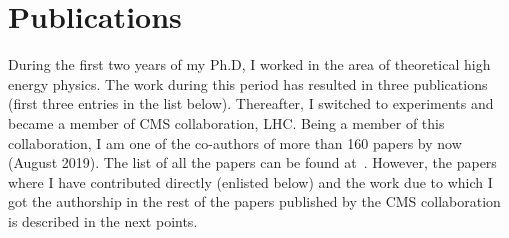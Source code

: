 \chapter {Publications}
During the first two years of my Ph.D, I worked in the area of theoretical high energy physics. The work during this period has resulted in three publications (first three entries in the list below). Thereafter, I switched to experiments and became a member of CMS collaboration, LHC. Being a member of this collaboration, I am one of the co-authors of more than 160 papers by now (August 2019). The list of all the papers can be found at~\cite{rvermaPub}. However, the papers where I have contributed directly 
(enlisted below) and the work due to which I got the authorship in the rest of the papers published by the CMS collaboration is described in the next points.

